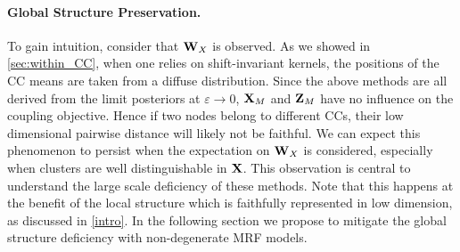 \paragraph{Global Structure Preservation. }
To gain intuition, consider that $\mathbf{W}_{X}$ is observed. As we showed in \cref{sec:within_CC}, when one relies on shift-invariant kernels, the positions of the CC means are taken from a diffuse distribution. Since the above methods are all derived from the limit posteriors at $\varepsilon \to 0$, $\mathbf{X}_{M}$ and $\mathbf{Z}_{M}$ have no influence on the coupling objective. Hence if two nodes belong to different CCs, their low dimensional pairwise distance will likely not be faithful. We can expect this phenomenon to persist when the expectation on $\mathbf{W}_{X}$ is considered, especially when clusters are well distinguishable in $\mathbf{X}$. This observation is central to understand the large scale deficiency of these methods. Note that this happens at the benefit of the local structure which is faithfully represented in low dimension, as discussed in \cref{intro}. In the following section we propose to mitigate the global structure deficiency with non-degenerate MRF models.
